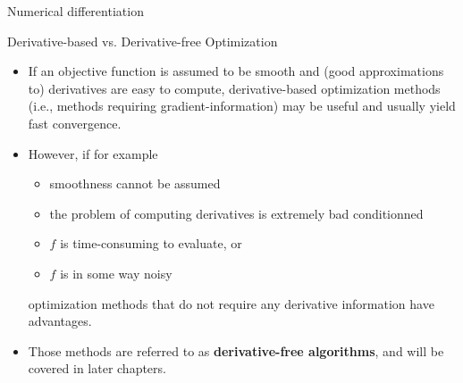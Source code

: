 \begin{vbframe}{Numerical differentiation}
  
  
  \end{vbframe}
  
  \begin{vbframe}{Derivative-based vs. Derivative-free Optimization }
  
  \begin{itemize}
    \item If an objective function is assumed to be smooth and (good approximations to) derivatives are easy to compute, derivative-based optimization methods (i.e., methods requiring gradient-information) may be useful and usually yield fast convergence. 
    \item However, if for example
    \begin{itemize}
      \item smoothness cannot be assumed
      \item the problem of computing derivatives is extremely bad conditionned
      \item $f$ is time-consuming to evaluate, or 
      \item $f$ is in some way noisy
    \end{itemize}
    optimization methods that do not require any derivative information have advantages. 
  \footnotesize	
    \item Those methods are referred to as \textbf{derivative-free algorithms}, and will be covered in later chapters. 
  \end{itemize}
  
  \end{vbframe}
  
  
  
  
  
  

